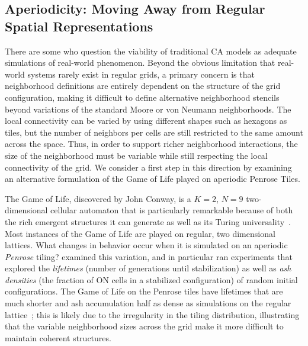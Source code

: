 \documentclass[a4paper,11pt]{article}
\begin{document}
\subsection{Aperiodicity: Moving Away from Regular Spatial Representations}

There are some who question the viability of traditional CA models as adequate simulations of real-world phenomenon. Beyond the obvious limitation that real-world systems rarely exist in regular grids, a primary concern is that neighborhood definitions are entirely dependent on the structure of the grid configuration, making it difficult to define alternative neighborhood stencils beyond variations of the standard Moore or von Neumann neighborhoods. The local connectivity can be varied by using different shapes such as hexagons as tiles, but the number of neighbors per cells are still restricted to the same amount across the space. Thus, in order to support richer neighborhood interactions, the size of the neighborhood must be variable while still respecting the local connectivity of the grid. We consider a first step in this direction by examining an alternative formulation of the Game of Life played on aperiodic Penrose Tiles.

The Game of Life, discovered by John Conway, is a $K=2$, $N=9$ two-dimensional cellular automaton that is particularly remarkable because of both the rich emergent structures it can generate as well as its Turing universality~\cite{ga70}.
Most instances of the Game of Life are played on regular, two dimensional lattices.
What changes in behavior occur when it is simulated on an aperiodic \textit{Penrose} tiling? \citeauthor{hi05} examined this variation, and in particular ran experiments that explored the \textit{lifetimes} (number of generations until stabilization) as well as  \textit{ash densities} (the fraction of ON cells in a stabilized configuration) of random initial configurations.
The Game of Life on the Penrose tiles have lifetimes that are much shorter and ash accumulation half as dense as simulations on the regular lattice~\cite{hi05}; this is likely due to the irregularity in the tiling distribution, illustrating that the variable neighborhood sizes across the grid make it more difficult to maintain coherent structures.
\end{document}
